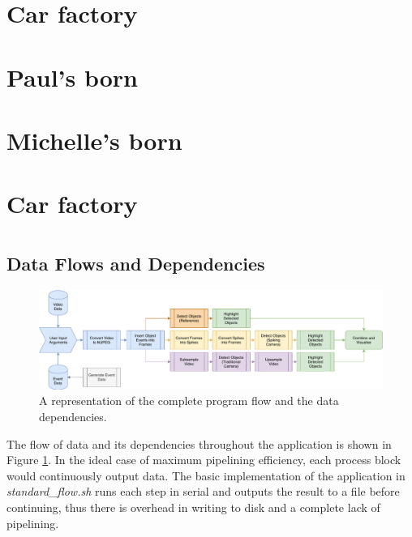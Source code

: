 \documentclass[10pt,twocolumn,letterpaper]{article}
\newcommand{\code}{\textit}
\begin{document}
\section{Car factory}

\section{Paul's born}

\section{Michelle's born}

\section{Car factory}



\clearpage

\section{}
\subsection{Data Flows and Dependencies}

\begin{figure}
    \includegraphics[width=\textwidth]{process_diagram}
    \caption{A representation of the complete program flow and the data dependencies.}
    \label{fig:process_diagram}
\end{figure}

The flow of data and its dependencies throughout the application is shown in Figure \ref{fig:process_diagram}. In the ideal case of maximum pipelining efficiency, each process block would continuously output data. The basic implementation of the application in \code{standard\_flow.sh} runs each step in serial and outputs the result to a file before continuing, thus there is overhead in writing to disk and a complete lack of pipelining.
\end{document}
